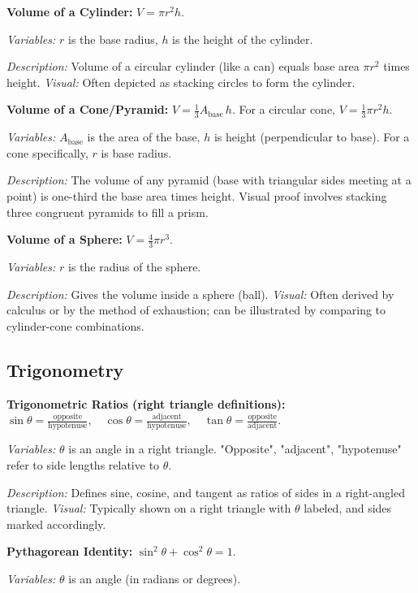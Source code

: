 \documentclass{article}
\begin{document}
\textbf{Volume of a Cylinder:} $V = \pi r^2 h$.

\textit{Variables:} $r$ is the base radius, $h$ is the height of the cylinder.

\textit{Description:} Volume of a circular cylinder (like a can) equals base area $\pi r^2$ times height. \textit{Visual:} Often depicted as stacking circles to form the cylinder.

\textbf{Volume of a Cone/Pyramid:} $V = \frac{1}{3} A_{\text{base}} \, h$. For a circular cone, $V=\frac{1}{3}\pi r^2 h$.

\textit{Variables:} $A_{\text{base}}$ is the area of the base, $h$ is height (perpendicular to base). For a cone specifically, $r$ is base radius.

\textit{Description:} The volume of any pyramid (base with triangular sides meeting at a point) is one-third the base area times height. Visual proof involves stacking three congruent pyramids to fill a prism.

\textbf{Volume of a Sphere:} $V = \frac{4}{3}\pi r^3$.

\textit{Variables:} $r$ is the radius of the sphere.

\textit{Description:} Gives the volume inside a sphere (ball). \textit{Visual:} Often derived by calculus or by the method of exhaustion; can be illustrated by comparing to cylinder-cone combinations.

\subsection*{Trigonometry}

\textbf{Trigonometric Ratios (right triangle definitions):} $\displaystyle \sin\theta = \frac{\text{opposite}}{\text{hypotenuse}},\quad \cos\theta = \frac{\text{adjacent}}{\text{hypotenuse}},\quad \tan\theta = \frac{\text{opposite}}{\text{adjacent}}$.

\textit{Variables:} $\theta$ is an angle in a right triangle. "Opposite", "adjacent", "hypotenuse" refer to side lengths relative to $\theta$.

\textit{Description:} Defines sine, cosine, and tangent as ratios of sides in a right-angled triangle. \textit{Visual:} Typically shown on a right triangle with $\theta$ labeled, and sides marked accordingly.

\textbf{Pythagorean Identity:} $\sin^2\theta + \cos^2\theta = 1$.

\textit{Variables:} $\theta$ is an angle (in radians or degrees).
\end{document}
